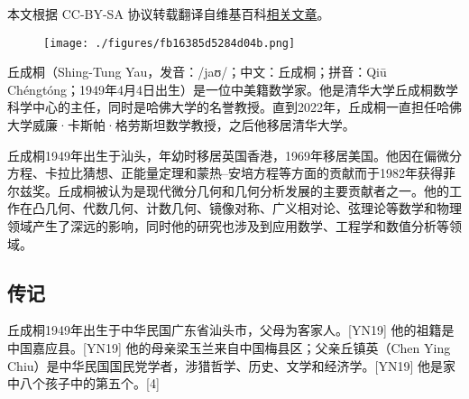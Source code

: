 
本文根据 CC-BY-SA 协议转载翻译自维基百科\href{https://en.wikipedia.org/wiki/Shing-Tung_Yau}{相关文章}。

\begin{figure}[ht]
\centering
\texttt{[image: ./figures/fb16385d5284d04b.png]}
\caption{} \label{fig_QCT_1}
\end{figure}
丘成桐（Shing-Tung Yau，发音：/jaʊ/；中文：丘成桐；拼音：Qiū Chéngtóng；1949年4月4日出生）是一位中美籍数学家。他是清华大学丘成桐数学科学中心的主任，同时是哈佛大学的名誉教授。直到2022年，丘成桐一直担任哈佛大学威廉·卡斯帕·格劳斯坦数学教授，之后他移居清华大学。

丘成桐1949年出生于汕头，年幼时移居英国香港，1969年移居美国。他因在偏微分方程、卡拉比猜想、正能量定理和蒙热–安培方程等方面的贡献而于1982年获得菲尔兹奖。丘成桐被认为是现代微分几何和几何分析发展的主要贡献者之一。他的工作在凸几何、代数几何、计数几何、镜像对称、广义相对论、弦理论等数学和物理领域产生了深远的影响，同时他的研究也涉及到应用数学、工程学和数值分析等领域。
\subsection{传记}  
丘成桐1949年出生于中华民国广东省汕头市，父母为客家人。[YN19] 他的祖籍是中国嘉应县。[YN19] 他的母亲梁玉兰来自中国梅县区；父亲丘镇英（Chen Ying Chiu）是中华民国国民党学者，涉猎哲学、历史、文学和经济学。[YN19] 他是家中八个孩子中的第五个。[4]


